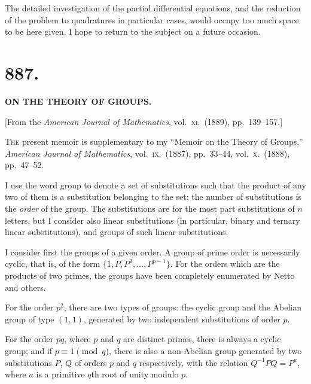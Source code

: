 \documentclass[11pt,a4paper]{article}
\theoremstyle{plain}
\theoremstyle{definition}
\begin{document}
The detailed investigation of the partial differential equations, and the reduction of the problem to quadratures in particular cases, would occupy too much space to be here given. I hope to return to the subject on a future occasion.


\newpage
\section*{887.}

\begin{center}
\textbf{ON THE THEORY OF GROUPS.}
\end{center}

\begin{center}
[From the \textit{American Journal of Mathematics}, vol.\ \textsc{xi}.\ (1889), pp.\ 139--157.]
\end{center}

\textsc{The} present memoir is supplementary to my ``Memoir on the Theory of Groups,'' \textit{American Journal of Mathematics}, vol.~\textsc{ix}.\ (1887), pp.\ 33--44, vol.~\textsc{x}.\ (1888), pp.\ 47--52.

I use the word group to denote a set of substitutions such that the product of any two of them is a substitution belonging to the set; the number of substitutions is the \textit{order} of the group. The substitutions are for the most part substitutions of $n$ letters, but I consider also linear substitutions (in particular, binary and ternary linear substitutions), and groups of such linear substitutions.

I consider first the groups of a given order. A group of prime order is necessarily cyclic, that is, of the form $\{1, P, P^2, \ldots, P^{p-1}\}$. For the orders which are the products of two primes, the groups have been completely enumerated by Netto and others.

For the order $p^2$, there are two types of groups: the cyclic group and the Abelian group of type $(1,1)$, generated by two independent substitutions of order $p$.

For the order $pq$, where $p$ and $q$ are distinct primes, there is always a cyclic group; and if $p \equiv 1 \pmod{q}$, there is also a non-Abelian group generated by two substitutions $P$, $Q$ of orders $p$ and $q$ respectively, with the relation $Q^{-1}PQ = P^a$, where $a$ is a primitive $q$th root of unity modulo $p$.
\end{document}

